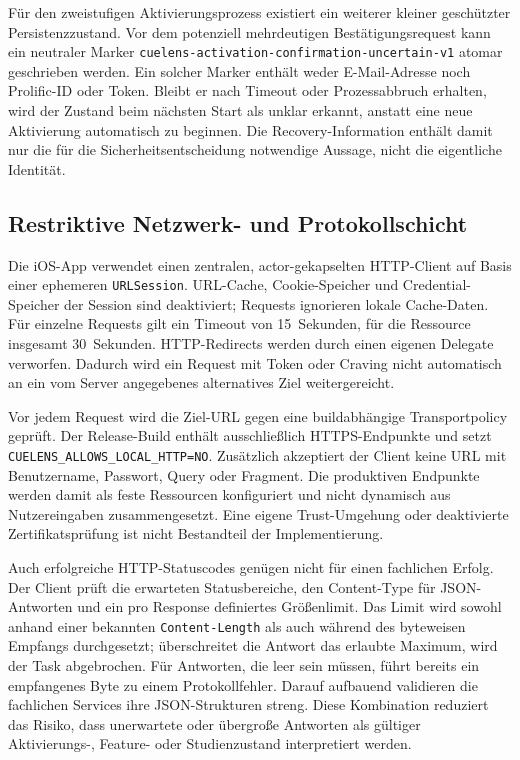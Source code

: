 \begin{neu}
Für den zweistufigen Aktivierungsprozess existiert ein weiterer kleiner geschützter Persistenzzustand. Vor dem potenziell mehrdeutigen Bestätigungsrequest kann ein neutraler Marker \texttt{cuelens-activation-confirmation-uncertain-v1} atomar geschrieben werden. Ein solcher Marker enthält weder E-Mail-Adresse noch Prolific-ID oder Token. Bleibt er nach Timeout oder Prozessabbruch erhalten, wird der Zustand beim nächsten Start als unklar erkannt, anstatt eine neue Aktivierung automatisch zu beginnen. Die Recovery-Information enthält damit nur die für die Sicherheitsentscheidung notwendige Aussage, nicht die eigentliche Identität.

\subsection{Restriktive Netzwerk- und Protokollschicht}

Die iOS-App verwendet einen zentralen, actor-gekapselten HTTP-Client auf Basis einer ephemeren \texttt{URLSession}. URL-Cache, Cookie-Speicher und Credential-Speicher der Session sind deaktiviert; Requests ignorieren lokale Cache-Daten. Für einzelne Requests gilt ein Timeout von 15~Sekunden, für die Ressource insgesamt 30~Sekunden. HTTP-Redirects werden durch einen eigenen Delegate verworfen. Dadurch wird ein Request mit Token oder Craving nicht automatisch an ein vom Server angegebenes alternatives Ziel weitergereicht.

Vor jedem Request wird die Ziel-URL gegen eine buildabhängige Transportpolicy geprüft. Der Release-Build enthält ausschließlich HTTPS-Endpunkte und setzt \texttt{CUELENS\_ALLOWS\_LOCAL\_HTTP=NO}. Zusätzlich akzeptiert der Client keine URL mit Benutzername, Passwort, Query oder Fragment. Die produktiven Endpunkte werden damit als feste Ressourcen konfiguriert und nicht dynamisch aus Nutzereingaben zusammengesetzt. Eine eigene Trust-Umgehung oder deaktivierte Zertifikatsprüfung ist nicht Bestandteil der Implementierung.

Auch erfolgreiche HTTP-Statuscodes genügen nicht für einen fachlichen Erfolg. Der Client prüft die erwarteten Statusbereiche, den Content-Type für JSON-Antworten und ein pro Response definiertes Größenlimit. Das Limit wird sowohl anhand einer bekannten \texttt{Content-Length} als auch während des byteweisen Empfangs durchgesetzt; überschreitet die Antwort das erlaubte Maximum, wird der Task abgebrochen. Für Antworten, die leer sein müssen, führt bereits ein empfangenes Byte zu einem Protokollfehler. Darauf aufbauend validieren die fachlichen Services ihre JSON-Strukturen streng. Diese Kombination reduziert das Risiko, dass unerwartete oder übergroße Antworten als gültiger Aktivierungs-, Feature- oder Studienzustand interpretiert werden.


\end{neu}
